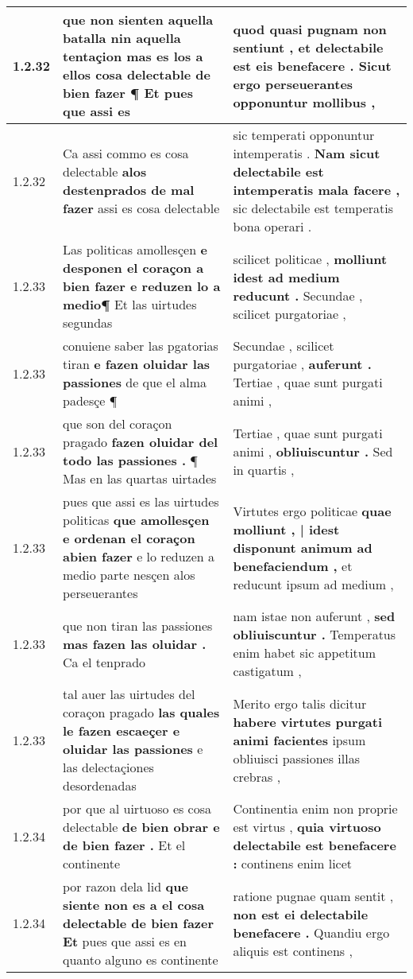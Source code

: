 \begin{tabular}{|p{1cm}|p{6.5cm}|p{6.5cm}|}
1.2.32 & que non sienten aquella batalla \textbf{ nin aquella tentaçion mas es los a ellos cosa delectable de bien fazer } ¶ Et pues que assi es & quod quasi pugnam non sentiunt , \textbf{ et delectabile est eis benefacere . } Sicut ergo perseuerantes opponuntur mollibus , \\\hline
1.2.32 & Ca assi commo es cosa delectable \textbf{ alos destenprados de mal fazer } assi es cosa delectable & sic temperati opponuntur intemperatis . \textbf{ Nam sicut delectabile est intemperatis mala facere , } sic delectabile est temperatis bona operari . \\\hline
1.2.33 & Las politicas amollesçen \textbf{ e desponen el coraçon a bien fazer e reduzen lo a medio¶ } Et las uirtudes segundas & scilicet politicae , \textbf{ molliunt idest ad medium reducunt . } Secundae , scilicet purgatoriae , \\\hline
1.2.33 & conuiene saber las pgatorias tiran \textbf{ e fazen oluidar las passiones } de que el alma padesçe ¶ & Secundae , scilicet purgatoriae , \textbf{ auferunt . } Tertiae , quae sunt purgati animi , \\\hline
1.2.33 & que son del coraçon pragado \textbf{ fazen oluidar del todo las passiones . } ¶ Mas en las quartas uirtades & Tertiae , quae sunt purgati animi , \textbf{ obliuiscuntur . } Sed in quartis , \\\hline
1.2.33 & pues que assi es las uirtudes politicas \textbf{ que amollesçen e ordenan el coraçon abien fazer } e lo reduzen a medio parte nesçen alos perseuerantes & Virtutes ergo politicae \textbf{ quae molliunt , | idest disponunt animum ad benefaciendum , } et reducunt ipsum ad medium , \\\hline
1.2.33 & que non tiran las passiones \textbf{ mas fazen las oluidar . } Ca el tenprado & nam istae non auferunt , \textbf{ sed obliuiscuntur . } Temperatus enim habet sic appetitum castigatum , \\\hline
1.2.33 & tal auer las uirtudes del coraçon pragado \textbf{ las quales le fazen escaeçer e oluidar las passiones } e las delectaçiones desordenadas & Merito ergo talis dicitur \textbf{ habere virtutes purgati animi facientes } ipsum obliuisci passiones illas crebras , \\\hline
1.2.34 & por que al uirtuoso es cosa delectable \textbf{ de bien obrar e de bien fazer . } Et el continente & Continentia enim non proprie est virtus , \textbf{ quia virtuoso delectabile est benefacere : } continens enim licet \\\hline
1.2.34 & por razon dela lid \textbf{ que siente non es a el cosa delectable de bien fazer Et } pues que assi es en quanto alguno es continente & ratione pugnae quam sentit , \textbf{ non est ei delectabile benefacere . } Quandiu ergo aliquis est continens , \\\hline

\end{tabular}

